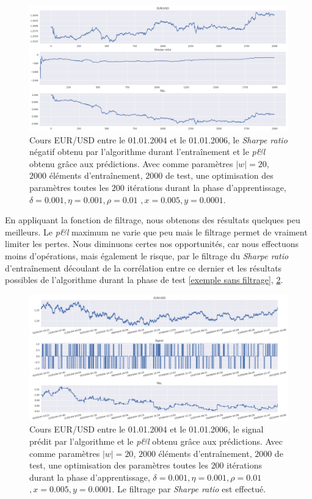 \documentclass[a4paper, 11pt]{article}
\begin{document}
\begin{figure}
	\centering
	\includegraphics[scale=0.5]{res/Exemple_St_negatif}
	\caption[Blup]{Cours EUR/USD entre le 01.01.2004 et le 01.01.2006, le \textit{Sharpe ratio} négatif obtenu par l'algorithme durant l'entraînement et le \textit{p\&l} obtenu grâce aux prédictions. Avec comme paramètres $|w| = 20$, $2000$ éléments d'entraînement, $2000$ de test, une optimisation des
		paramètres toutes les $200$ itérations durant la phase d'apprentissage, $\delta = 0.001, \eta=0.001,\rho=0.01$
		\footnotemark$, x = 0.005, y=0.0001$. }
	\label{exemple st negatif}
\end{figure}

En appliquant la fonction de filtrage, nous obtenons des résultats quelques peu meilleurs. Le \textit{p\&l} maximum ne varie que peu mais le filtrage permet de vraiment limiter les pertes. Nous diminuons certes nos opportunités, car nous effectuons moins d'opérations, mais également le risque, par le filtrage du \textit{Sharpe ratio} d'entraînement découlant de la corrélation entre ce dernier et les résultats possibles de l'algorithme durant la phase de test \ref{exemple sans filtrage}, \ref{exemple avec filtrage}. 

\begin{figure}
	\centering
	\includegraphics[scale=0.5]{res/exemple_avec_filtrage}
	\caption[Blup]{Cours EUR/USD entre le 01.01.2004 et le 01.01.2006, le signal prédit par l'algorithme et le \textit{p\&l} obtenu grâce aux prédictions. Avec comme paramètres $|w| = 20$, $2000$ éléments d'entraînement, $2000$ de test, une optimisation des
		paramètres toutes les $200$ itérations durant la phase d'apprentissage, $\delta = 0.001, \eta=0.001,\rho=0.01$
		\footnotemark$, x = 0.005, y=0.0001$. Le filtrage par \textit{Sharpe ratio} est effectué.}
	\label{exemple avec filtrage}
\end{figure}
\end{document}
